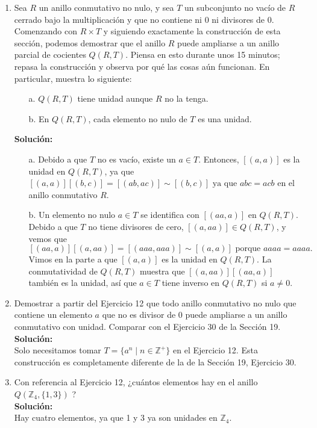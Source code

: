 \begin{enumerate}
	\item  Sea \(R\) un anillo conmutativo no nulo, y sea \(T\) un subconjunto no vacío de \(R\) cerrado bajo la multiplicación y que no contiene ni 0 ni divisores de 0. Comenzando con \(R \times T\) y siguiendo exactamente la construcción de esta sección, podemos demostrar que el anillo \(R\) puede ampliarse a un anillo parcial de cocientes \(Q(R, T)\). Piensa en esto durante unos 15 minutos; repasa la construcción y observa por qué las cosas aún funcionan. En particular, muestra lo siguiente:
	\begin{enumerate}
		\item[a.] \(Q(R, T)\) tiene unidad aunque \(R\) no la tenga.
		\item[b.] En \(Q(R, T)\), cada elemento no nulo de \(T\) es una unidad.
	\end{enumerate}
	\textbf{Solución:} 
	\begin{enumerate}
		\item[a.] Debido a que \(T\) no es vacío, existe un \(a \in T\). Entonces, \( [(a, a)] \) es la unidad en \(Q(R, T)\), ya que $[(a, a)][(b, c)] = [(ab, ac)] \sim [(b, c)] \text{ ya que } abc = acb$
		en el anillo conmutativo \(R\).
		\item[b.]  Un elemento no nulo \(a \in T\) se identifica con \( [(aa, a)] \) en \(Q(R, T)\). Debido a que \(T\) no tiene divisores de cero, \( [(a, aa)] \in Q(R, T) \), y vemos que
		$[(aa, a)][(a, aa)] = [(aaa, aaa)] \sim [(a, a)] \text{ porque } aaaa = aaaa.$
		Vimos en la parte a que \( [(a, a)] \) es la unidad en \(Q(R, T)\). La conmutatividad de \(Q(R, T)\) muestra que \( [(a, aa)][(aa, a)] \) también es la unidad, así que \(a \in T\) tiene inverso en \(Q(R, T)\) si \(a \neq 0\).
	\end{enumerate}
	
	
	\item Demostrar a partir del Ejercicio 12 que todo anillo conmutativo no nulo que contiene un elemento \(a\) que no es divisor de 0 puede ampliarse a un anillo conmutativo con unidad. Comparar con el Ejercicio 30 de la Sección 19.
	\\ \textbf{Solución:} \\
	Solo necesitamos tomar \(T = \{a^n \mid n \in \mathbb{Z}^+\}\) en el Ejercicio 12. Esta construcción es completamente diferente de la de la Sección 19, Ejercicio 30.
	
	\item Con referencia al Ejercicio 12, ¿cuántos elementos hay en el anillo \(Q(\mathbb{Z}_{4}, \{1,3\})\) ?
	\\ \textbf{Solución:} \\
	Hay cuatro elementos, ya que 1 y 3 ya son unidades en \(\mathbb{Z}_4\).
	

\end{enumerate}
